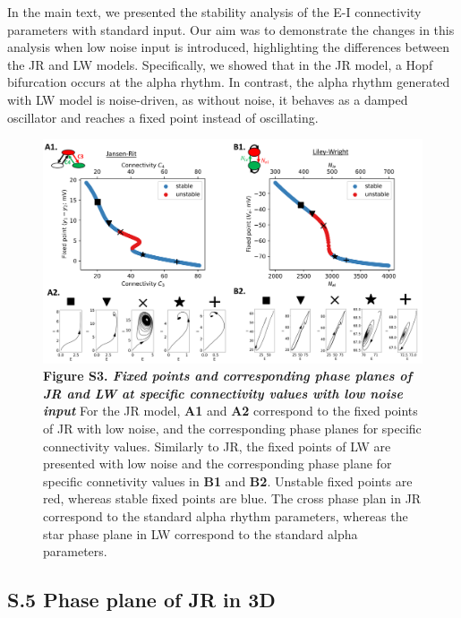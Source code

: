 \documentclass[12pt,twoside]{article}
\begin{document}
In the main text, we presented the stability analysis of the E-I connectivity parameters with standard input. Our aim was to demonstrate the changes in this analysis when low noise input is introduced, highlighting the differences between the JR and LW models. Specifically, we showed that in the JR model, a Hopf bifurcation occurs at the alpha rhythm. In contrast, the alpha rhythm generated with LW model is noise-driven, as without noise, it behaves as a damped oscillator and reaches a fixed point instead of oscillating. 

\begin{figure}[H]
    \hspace*{-0.7cm}
    \includegraphics[scale=0.49]{Images/Short_Low_Noise.png}
    \caption*{\textbf{Figure S3. \textit{Fixed points and corresponding phase planes of JR and LW at specific connectivity values with low noise input}} For the JR model, \textbf{A1} and \textbf{A2} correspond to the fixed points of JR with low noise, and the corresponding phase planes for specific connectivity values. Similarly to JR, the fixed points of LW are presented with low noise and the corresponding phase plane for specific connetivity values in \textbf{B1} and \textbf{B2}. Unstable fixed points are red, whereas stable fixed points are blue. The cross phase plan in JR correspond to the standard alpha rhythm parameters, whereas the star phase plane in LW correspond to the standard alpha parameters.} \label{fig:Fixed_points}
\end{figure}

\newpage
\subsection*{S.5 Phase plane of JR in 3D}
\end{document}
